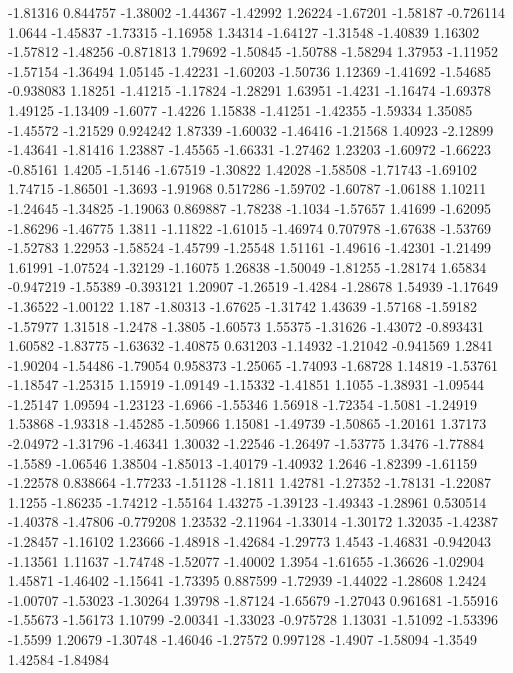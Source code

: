 \documentclass[9pt]{article}
\theoremstyle{plain}
\theoremstyle{definition}
\theoremstyle{remark}
\numberwithin{equation}{section}
\begin{document}
-1.81316
0.844757
-1.38002
-1.44367
-1.42992
1.26224
-1.67201
-1.58187
-0.726114
1.0644
-1.45837
-1.73315
-1.16958
1.34314
-1.64127
-1.31548
-1.40839
1.16302
-1.57812
-1.48256
-0.871813
1.79692
-1.50845
-1.50788
-1.58294
1.37953
-1.11952
-1.57154
-1.36494
1.05145
-1.42231
-1.60203
-1.50736
1.12369
-1.41692
-1.54685
-0.938083
1.18251
-1.41215
-1.17824
-1.28291
1.63951
-1.4231
-1.16474
-1.69378
1.49125
-1.13409
-1.6077
-1.4226
1.15838
-1.41251
-1.42355
-1.59334
1.35085
-1.45572
-1.21529
0.924242
1.87339
-1.60032
-1.46416
-1.21568
1.40923
-2.12899
-1.43641
-1.81416
1.23887
-1.45565
-1.66331
-1.27462
1.23203
-1.60972
-1.66223
-0.85161
1.4205
-1.5146
-1.67519
-1.30822
1.42028
-1.58508
-1.71743
-1.69102
1.74715
-1.86501
-1.3693
-1.91968
0.517286
-1.59702
-1.60787
-1.06188
1.10211
-1.24645
-1.34825
-1.19063
0.869887
-1.78238
-1.1034
-1.57657
1.41699
-1.62095
-1.86296
-1.46775
1.3811
-1.11822
-1.61015
-1.46974
0.707978
-1.67638
-1.53769
-1.52783
1.22953
-1.58524
-1.45799
-1.25548
1.51161
-1.49616
-1.42301
-1.21499
1.61991
-1.07524
-1.32129
-1.16075
1.26838
-1.50049
-1.81255
-1.28174
1.65834
-0.947219
-1.55389
-0.393121
1.20907
-1.26519
-1.4284
-1.28678
1.54939
-1.17649
-1.36522
-1.00122
1.187
-1.80313
-1.67625
-1.31742
1.43639
-1.57168
-1.59182
-1.57977
1.31518
-1.2478
-1.3805
-1.60573
1.55375
-1.31626
-1.43072
-0.893431
1.60582
-1.83775
-1.63632
-1.40875
0.631203
-1.14932
-1.21042
-0.941569
1.2841
-1.90204
-1.54486
-1.79054
0.958373
-1.25065
-1.74093
-1.68728
1.14819
-1.53761
-1.18547
-1.25315
1.15919
-1.09149
-1.15332
-1.41851
1.1055
-1.38931
-1.09544
-1.25147
1.09594
-1.23123
-1.6966
-1.55346
1.56918
-1.72354
-1.5081
-1.24919
1.53868
-1.93318
-1.45285
-1.50966
1.15081
-1.49739
-1.50865
-1.20161
1.37173
-2.04972
-1.31796
-1.46341
1.30032
-1.22546
-1.26497
-1.53775
1.3476
-1.77884
-1.5589
-1.06546
1.38504
-1.85013
-1.40179
-1.40932
1.2646
-1.82399
-1.61159
-1.22578
0.838664
-1.77233
-1.51128
-1.1811
1.42781
-1.27352
-1.78131
-1.22087
1.1255
-1.86235
-1.74212
-1.55164
1.43275
-1.39123
-1.49343
-1.28961
0.530514
-1.40378
-1.47806
-0.779208
1.23532
-2.11964
-1.33014
-1.30172
1.32035
-1.42387
-1.28457
-1.16102
1.23666
-1.48918
-1.42684
-1.29773
1.4543
-1.46831
-0.942043
-1.13561
1.11637
-1.74748
-1.52077
-1.40002
1.3954
-1.61655
-1.36626
-1.02904
1.45871
-1.46402
-1.15641
-1.73395
0.887599
-1.72939
-1.44022
-1.28608
1.2424
-1.00707
-1.53023
-1.30264
1.39798
-1.87124
-1.65679
-1.27043
0.961681
-1.55916
-1.55673
-1.56173
1.10799
-2.00341
-1.33023
-0.975728
1.13031
-1.51092
-1.53396
-1.5599
1.20679
-1.30748
-1.46046
-1.27572
0.997128
-1.4907
-1.58094
-1.3549
1.42584
-1.84984
\end{document}
